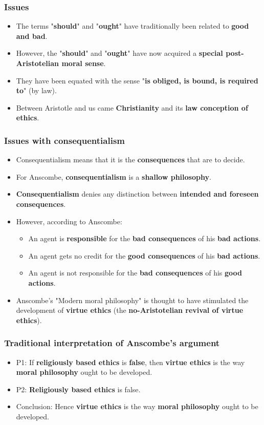 \documentclass[11pt]{article}
\begin{document}
\subsubsection{Issues}
\label{sec:org1759030}
\begin{itemize}
\item The terms "\textbf{should}" and "\textbf{ought}" have traditionally been related to \textbf{good and bad}.
\item However, the "\textbf{should}" and "\textbf{ought}" have now acquired a \textbf{special post-Aristotelian moral sense}.
\item They have been equated with the sense "\textbf{is obliged, is bound, is required to}" (by law).
\item Between Aristotle and us came \textbf{Christianity} and its \textbf{law conception of ethics}.
\end{itemize}

 \newpage
\subsubsection{Issues with consequentialism}
\label{sec:orga3404b0}
\begin{itemize}
\item Consequentialism means that it is the \textbf{consequences} that are to decide.
\item For Anscombe, \textbf{consequentialism} is a \textbf{shallow philosophy}.
\item \textbf{Consequentialism} denies any distinction between \textbf{intended and foreseen consequences}.
\item However, according to Anscombe:
\begin{itemize}
\item An agent is \textbf{responsible} for the \textbf{bad consequences} of his \textbf{bad actions}.
\item An agent gets no credit for the \textbf{good consequences} of his \textbf{bad actions}.
\item An agent is not responsible for the \textbf{bad consequences} of his \textbf{good actions}.
\end{itemize}
\item Anscombe's "Modern moral philosophy" is thought to have stimulated the development of \textbf{virtue ethics} (the \textbf{no-Aristotelian revival of virtue ethics}).
\end{itemize}
\subsubsection{Traditional interpretation of Anscombe's argument}
\label{sec:orgdd4d654}
\begin{itemize}
\item P1: If \textbf{religiously based ethics} is \textbf{false}, then \textbf{virtue ethics} is the way \textbf{moral philosophy} ought to be developed.
\item P2: \textbf{Religiously based ethics} is false.
\item Conclusion: Hence \textbf{virtue ethics} is the way \textbf{moral philosophy} ought to be developed.
\end{itemize}
\end{document}
